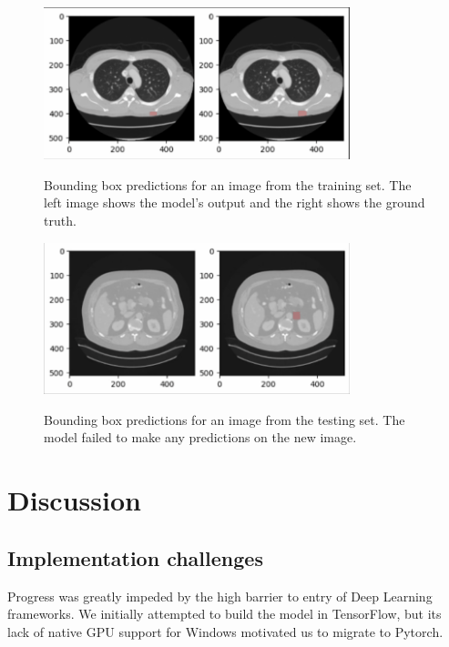 \begin{figure}
 \begin{center}
 \includegraphics[width=3.5in]{images/training performance.PNG}\\
 \caption{Bounding box predictions for an image from the training set. The left image shows the model's output and the right shows the ground truth.}\label{fig:training}
 \end{center}
\end{figure}

\begin{figure}
 \begin{center}
 \includegraphics[width=3.5in]{images/testing performance.png}\\
 \caption{Bounding box predictions for an image from the testing set. The model failed to make any predictions on the new image.}\label{fig:testing}
 \end{center}
\end{figure}

\section{Discussion}
\subsection{Implementation challenges}
Progress was greatly impeded by the high barrier to entry of Deep Learning frameworks. We initially attempted to build the model in TensorFlow, but its lack of native GPU support for Windows motivated us to migrate to Pytorch. 

